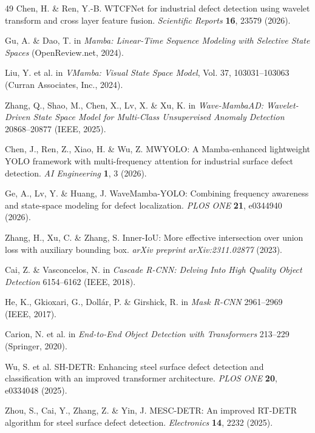 \documentclass[pdflatex,sn-nature]{sn-jnl}
\begin{document}
\begin{thebibliography}{49}
Chen, H. \& Ren, Y.-B. WTCFNet for industrial defect detection using wavelet transform and cross layer feature fusion. \textit{Scientific Reports} \textbf{16}, 23579 (2026).

Gu, A. \& Dao, T. in \textit{Mamba: Linear-Time Sequence Modeling with Selective State Spaces} (OpenReview.net, 2024).

Liu, Y. et al. in \textit{VMamba: Visual State Space Model}, Vol. 37, 103031--103063 (Curran Associates, Inc., 2024).

Zhang, Q., Shao, M., Chen, X., Lv, X. \& Xu, K. in \textit{Wave-MambaAD: Wavelet-Driven State Space Model for Multi-Class Unsupervised Anomaly Detection} 20868--20877 (IEEE, 2025).

Chen, J., Ren, Z., Xiao, H. \& Wu, Z. MWYOLO: A Mamba-enhanced lightweight YOLO framework with multi-frequency attention for industrial surface defect detection. \textit{AI Engineering} \textbf{1}, 3 (2026).

Ge, A., Lv, Y. \& Huang, J. WaveMamba-YOLO: Combining frequency awareness and state-space modeling for defect localization. \textit{PLOS ONE} \textbf{21}, e0344940 (2026).

Zhang, H., Xu, C. \& Zhang, S. Inner-IoU: More effective intersection over union loss with auxiliary bounding box. \textit{arXiv preprint arXiv:2311.02877} (2023).

Cai, Z. \& Vasconcelos, N. in \textit{Cascade R-CNN: Delving Into High Quality Object Detection} 6154--6162 (IEEE, 2018).

He, K., Gkioxari, G., Doll{\'a}r, P. \& Girshick, R. in \textit{Mask R-CNN} 2961--2969 (IEEE, 2017).

Carion, N. et al. in \textit{End-to-End Object Detection with Transformers} 213--229 (Springer, 2020).

Wu, S. et al. SH-DETR: Enhancing steel surface defect detection and classification with an improved transformer architecture. \textit{PLOS ONE} \textbf{20}, e0334048 (2025).

Zhou, S., Cai, Y., Zhang, Z. \& Yin, J. MESC-DETR: An improved RT-DETR algorithm for steel surface defect detection. \textit{Electronics} \textbf{14}, 2232 (2025).


\end{thebibliography}
\end{document}
